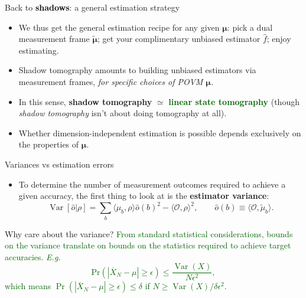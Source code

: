 \documentclass{beamer}
\begin{document}
\begin{frame}{Back to \textcolor{black}{\textbf{shadows}}: a general estimation strategy}
    \begin{itemize}\setlength\itemsep{1em}
        \item We thus get the general estimation recipe for any given $\boldsymbol\mu$: pick a dual measurement frame $\tilde{\boldsymbol\mu}$; get your complimentary unbiased estimator $\hat f$; enjoy estimating. \pause
        \item \colorbox{orange!15}{\parbox[t]{\dimexpr\linewidth-2\fboxsep}{Shadow tomography amounts to building unbiased estimators via measurement frames, \textit{for specific choices of POVM $\boldsymbol\mu$.}}} \pause
        \item In this sense, \colorbox{yellow!20}{\textbf{shadow tomography} $\simeq$ \textcolor{darkgreen}{\textbf{linear state tomography}}} (though \textit{shadow tomography} isn't about doing tomography at all). \pause
        \item Whether dimension-independent estimation is possible depends exclusively on the properties of $\boldsymbol\mu$.
    \end{itemize}
\end{frame}


\begin{frame}{Variances vs estimation errors}\small
    \begin{itemize}
        \item To determine the number of measurement outcomes required to achieve a given accuracy, the first thing to look at is the \textbf{estimator variance}:
        \begin{equation*}
            \operatorname{Var}[\hat o|\rho] =
            \sum_b \langle\mu_b,\rho\rangle \hat o(b)^2
            - \langle \mathcal O, \rho\rangle^2,
            \qquad \hat o(b)\equiv \langle \mathcal O,\tilde\mu_b\rangle.
        \end{equation*}
    \end{itemize}
    \begin{center}
    \begin{beamerboxesrounded}[shadow=true]{Why care about the variance?}
    \textcolor{darkgreen}{
    From standard statistical considerations, bounds on the variance translate on bounds on the statistics required to achieve target accuracies. \textit{E.g.}
        \begin{equation*}
            \text{Pr}(|\overline X_N-\mu|\ge \epsilon) \le \frac{\operatorname{Var}(X)}{N\epsilon^2},
        \end{equation*}
    which means $\operatorname{Pr}(|\overline X_N-\mu|\ge\epsilon)\le\delta$ if $N\ge \operatorname{Var}(X)/\delta\epsilon^2$.
    }
    \end{beamerboxesrounded}
    \end{center}
\end{frame}
\end{document}
